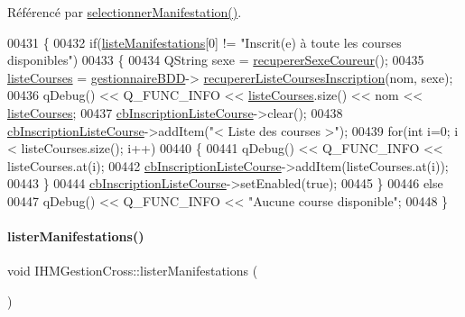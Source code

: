 Référencé par \hyperlink{class_i_h_m_gestion_cross_a60fc58610d01534b3df66ac7dd76b4dc}{selectionner\+Manifestation()}.


\begin{DoxyCode}
00431 \{
00432     \textcolor{keywordflow}{if}(\hyperlink{class_i_h_m_gestion_cross_ac42ca910fa9802b3f63e3393aaa14e8a}{listeManifestations}[0] != \textcolor{stringliteral}{"Inscrit(e) à toute les courses disponibles"})
00433     \{
00434         QString sexe = \hyperlink{class_i_h_m_gestion_cross_a7e1cdc8b3b01f2f2f666f80bf1cc9f5a}{recupererSexeCoureur}();
00435         \hyperlink{class_i_h_m_gestion_cross_a66fc14c0ed874e72b6ada34e9b83603a}{listeCourses} = \hyperlink{class_i_h_m_gestion_cross_a440bac63a3e51db3e2c08e883f8cafc9}{gestionnaireBDD}->
      \hyperlink{class_gestion_b_d_d_a59ef29e28993c64aa4d5a8c42a8fb08d}{recupererListeCoursesInscription}(nom, sexe);
00436         qDebug() << Q\_FUNC\_INFO << \hyperlink{class_i_h_m_gestion_cross_a66fc14c0ed874e72b6ada34e9b83603a}{listeCourses}.size() << nom << 
      \hyperlink{class_i_h_m_gestion_cross_a66fc14c0ed874e72b6ada34e9b83603a}{listeCourses};
00437         \hyperlink{class_i_h_m_gestion_cross_aff44e6f1a225ee5b55783afe72049f83}{cbInscriptionListeCourse}->clear();
00438         \hyperlink{class_i_h_m_gestion_cross_aff44e6f1a225ee5b55783afe72049f83}{cbInscriptionListeCourse}->addItem(\textcolor{stringliteral}{"< Liste des courses >"});
00439         \textcolor{keywordflow}{for}(\textcolor{keywordtype}{int} i=0; i < listeCourses.size(); i++)
00440         \{
00441             qDebug() << Q\_FUNC\_INFO << listeCourses.at(i);
00442             \hyperlink{class_i_h_m_gestion_cross_aff44e6f1a225ee5b55783afe72049f83}{cbInscriptionListeCourse}->addItem(listeCourses.at(i));
00443         \}
00444         \hyperlink{class_i_h_m_gestion_cross_aff44e6f1a225ee5b55783afe72049f83}{cbInscriptionListeCourse}->setEnabled(\textcolor{keyword}{true});
00445     \}
00446     \textcolor{keywordflow}{else}
00447         qDebug() << Q\_FUNC\_INFO << \textcolor{stringliteral}{"Aucune course disponible"};
00448 \}
\end{DoxyCode}
\mbox{\label{class_i_h_m_gestion_cross_a0eadd8592c966c89bf7b5a25a0ae7589}} 
\paragraph{\texorpdfstring{lister\+Manifestations()}{listerManifestations()}}
{\footnotesize\ttfamily void I\+H\+M\+Gestion\+Cross\+::lister\+Manifestations (\begin{DoxyParamCaption}{ }\end{DoxyParamCaption})\hspace{0.3cm}{\ttfamily [private]}}



